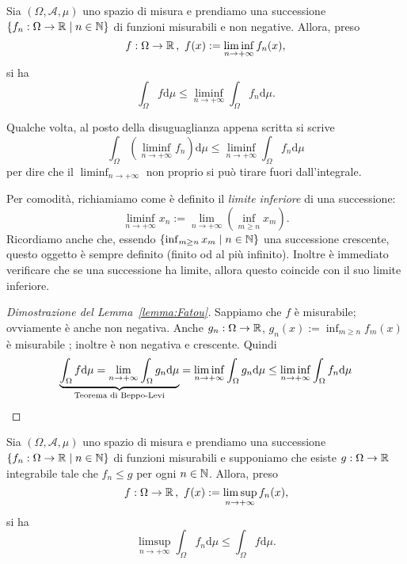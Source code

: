 \begin{lemma}[di Fatou]\label{lemma:Fatou}
Sia \((\Omega, \mathcal A, \mu)\) uno spazio di misura e prendiamo una successione \(\left\{f_n : \Omega \to \mathbb R \mid n \in \mathbb N\right\}\) di funzioni misurabili e non negative. Allora, preso
\[f : \Omega \to \mathbb R \,, \ f(x) := \liminf_{n \to +\infty} f_n(x) ,\]
si ha
\[\int_\Omega f \mathrm d \mu \le \liminf_{n \to +\infty} \int_\Omega f_n \mathrm d \mu .\]
\end{lemma}

Qualche volta, al posto della disuguaglianza appena scritta si scrive
\[\int_\Omega \left(\liminf_{n \to +\infty} f_n\right) \mathrm d \mu \le \liminf_{n \to +\infty} \int_\Omega f_n \mathrm d \mu\]
per dire che il \(\liminf_{n \to +\infty}\) non proprio si può tirare fuori dall'integrale.

Per comodità, richiamiamo come è definito il {\em limite inferiore} di una successione:
\[\liminf_{n \to +\infty} x_n := \lim_{n \to +\infty} \left(\inf_{m \ge n} x_m\right) .\]
Ricordiamo anche che, essendo \(\left\{\inf_{m \ge n} x_m \mid n \in \mathbb N\right\}\) una successione crescente, questo oggetto è sempre definito (finito od al più infinito). Inoltre è immediato verificare che se una successione ha limite, allora questo coincide con il suo limite inferiore.

\begin{proof}[Dimostrazione del Lemma~\ref{lemma:Fatou}]
 Sappiamo che \(f\) è misurabile; ovviamente è anche non negativa. Anche \(g_n : \Omega \to \mathbb R\), \(g_n(x) := \inf_{m \ge n} f_m(x)\) è misurabile ; inoltre è non negativa e crescente. Quindi
\[\underbrace{\int_\Omega f \mathrm d \mu = \lim_{n \to +\infty} \int_\Omega g_n \mathrm d \mu}_{\text{Teorema di Beppo-Levi}} = \liminf_{n \to +\infty} \int_\Omega g_n \mathrm d \mu \le \liminf_{n \to +\infty} \int_\Omega f_n \mathrm d \mu \qedhere\]
\end{proof}

\begin{lemma}[di Fatou II]\label{lemma:Fatou2}
Sia \((\Omega, \mathcal A, \mu)\) uno spazio di misura e prendiamo una successione \(\left\{f_n : \Omega \to \mathbb R \mid n \in \mathbb N\right\}\) di funzioni misurabili e supponiamo che esiste \(g : \Omega \to \mathbb R\) integrabile tale che \(f_n \le g\) per ogni \(n \in \mathbb N\). Allora, preso
\[f : \Omega \to \mathbb R \,, \ f(x) := \limsup_{n \to +\infty} f_n(x) ,\]
si ha
\[\limsup_{n \to +\infty} \int_\Omega f_n \mathrm d \mu \le \int_\Omega f \mathrm d \mu .\]
\end{lemma}

